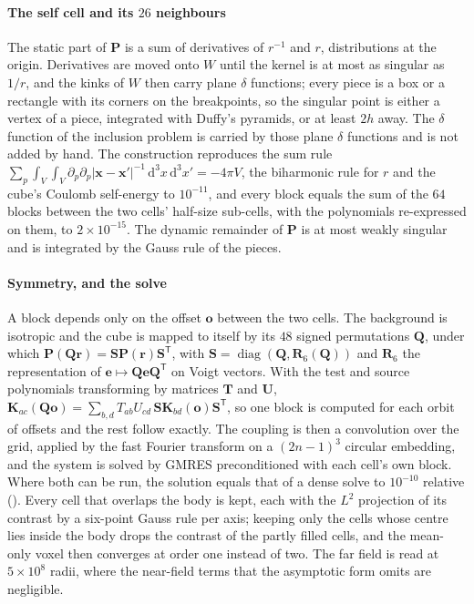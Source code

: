 \documentclass[preprint,review,12pt]{elsarticle}
\newcommand{\bK}{\mathbf{K}}
\newcommand{\bP}{\mathbf{P}}
\newcommand{\dd}{\mathrm{d}}
\begin{document}
\paragraph{The self cell and its $26$ neighbours} The static part of $\bP$ is a sum of derivatives of
$r^{-1}$ and $r$, distributions at the origin. Derivatives are moved onto $W$ until the kernel is at most
as singular as $1/r$, and the kinks of $W$ then carry plane $\delta$ functions; every piece is a box or a
rectangle with its corners on the breakpoints, so the singular point is either a vertex of a piece,
integrated with Duffy's pyramids, or at least $2h$ away. The $\delta$ function of the inclusion problem
is carried by those plane $\delta$ functions and is not added by hand. The construction reproduces the
sum rule $\sum_p\int_V\!\int_V\partial_p\partial_p\lvert\mathbf{x}-\mathbf{x}'\rvert^{-1}\,\dd^3x\,\dd^3x'=-4\pi V$, the biharmonic rule for
$r$ and the cube's Coulomb self-energy to $10^{-11}$, and every block equals the sum of the $64$ blocks
between the two cells' half-size sub-cells, with the polynomials re-expressed on them, to
$2\times10^{-15}$. The dynamic remainder of $\bP$ is at most weakly singular and is integrated by the
Gauss rule of the pieces.

\paragraph{Symmetry, and the solve} A block depends only on the offset $\mathbf{o}$ between the two
cells. The background is isotropic and the cube is mapped to itself by its $48$ signed permutations
$\mathbf{Q}$, under which $\bP(\mathbf{Q}\mathbf{r})=\mathbf{S}\bP(\mathbf{r})\mathbf{S}^{\mathsf T}$, with
$\mathbf{S}=\operatorname{diag}(\mathbf{Q},\mathbf{R}_6(\mathbf{Q}))$ and $\mathbf{R}_6$ the representation of
$\mathbf{e}\mapsto\mathbf{Q}\mathbf{e}\mathbf{Q}^{\mathsf T}$ on Voigt vectors. With the test and source
polynomials transforming by matrices $\mathbf{T}$ and $\mathbf{U}$,
$\bK_{ac}(\mathbf{Q}\mathbf{o})=\sum_{b,d}T_{ab}U_{cd}\,\mathbf{S}\bK_{bd}(\mathbf{o})\mathbf{S}^{\mathsf T}$,
so one block is computed for each orbit of offsets and the rest follow exactly. The coupling is then a
convolution over the grid, applied by the fast Fourier transform on a $(2n-1)^3$ circular embedding, and
the system is solved by GMRES preconditioned with each cell's own block. Where both can be run, the
solution equals that of a dense solve to $10^{-10}$ relative ().
Every cell that overlaps the body is kept, each with the $L^2$ projection of its contrast by a six-point
Gauss rule per axis; keeping only the cells whose centre lies inside the body drops the contrast of the
partly filled cells, and the mean-only voxel then converges at order one instead of two. The far field is
read at $5\times10^8$ radii, where the near-field terms that the asymptotic form omits are negligible.
\end{document}
